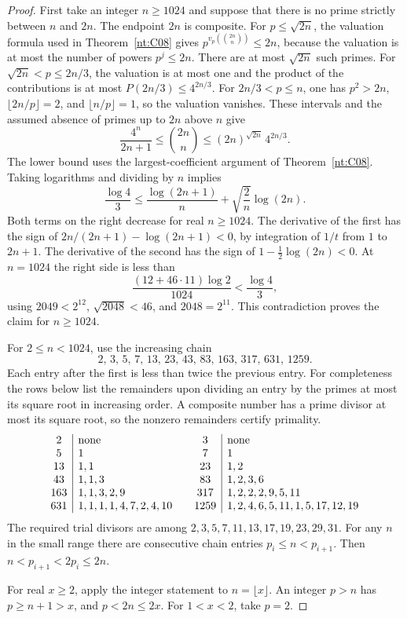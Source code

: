 \documentclass[11pt,oneside,openany]{book}
\theoremstyle{plain}
\theoremstyle{definition}
\theoremstyle{remark}
\begin{document}
\begin{proof}
First take an integer \(n\ge1024\) and suppose that there is no prime
strictly between \(n\) and \(2n\). The endpoint \(2n\) is composite.
For \(p\le\sqrt{2n}\), the valuation formula used in
Theorem~\ref{nt:C08} gives \(p^{v_p(\binom{2n}{n})}\le2n\), because the
valuation is at most the number of powers \(p^j\le2n\). There are at
most \(\sqrt{2n}\) such primes. For \(\sqrt{2n}<p\le 2n/3\), the
valuation is at most one and the product of the contributions is at
most \(P(2n/3)\le4^{2n/3}\). For \(2n/3<p\le n\), one has \(p^2>2n\),
\(\lfloor 2n/p\rfloor=2\), and \(\lfloor n/p\rfloor=1\), so the
valuation vanishes. These intervals and the assumed absence of
primes up to \(2n\) above \(n\) give
\[
 \frac{4^n}{2n+1}\le\binom{2n}{n}
       \le (2n)^{\sqrt{2n}}\,4^{2n/3}.
\]
The lower bound uses the largest-coefficient argument of
Theorem~\ref{nt:C08}. Taking logarithms and dividing by \(n\) implies
\[
 \frac{\log4}{3}\le
 \frac{\log(2n+1)}{n}+\sqrt{\frac2n}\log(2n).
\]
Both terms on the right decrease for real \(n\ge1024\). The derivative
of the first has the sign of
\(2n/(2n+1)-\log(2n+1)<0\), by integration of \(1/t\) from \(1\) to
\(2n+1\). The derivative of the second has the sign of
\(1-\tfrac12\log(2n)<0\). At \(n=1024\) the right side is less than
\[
 \frac{(12+46\cdot 11)\log2}{1024}<\frac{\log4}{3},
\]
using \(2049<2^{12}\), \(\sqrt{2048}<46\), and \(2048=2^{11}\).
This contradiction proves the claim for \(n\ge1024\).

For \(2\le n<1024\), use the increasing chain
\[
 2,\,3,\,5,\,7,\,13,\,23,\,43,\,83,\,163,\,317,\,631,\,1259 .
\]
Each entry after the first is less than twice the previous entry.
For completeness the rows below list the remainders upon dividing an
entry by the primes at most its square root in increasing order.
A composite number has a prime divisor at most its square root, so
the nonzero remainders certify primality.
\[
\begin{array}{c|l@{\qquad}c|l}
 2&\text{none}&3&\text{none}\\
 5&1&7&1\\
 13&1,1&23&1,2\\
 43&1,1,3&83&1,2,3,6\\
 163&1,1,3,2,9&317&1,2,2,2,9,5,11\\
 631&1,1,1,1,4,7,2,4,10&1259&1,2,4,6,5,11,1,5,17,12,19
\end{array}
\]
The required trial divisors are among
\(2,3,5,7,11,13,17,19,23,29,31\).
For any \(n\) in the small range there are consecutive chain entries
\(p_i\le n<p_{i+1}\). Then \(n<p_{i+1}<2p_i\le2n\).

For real \(x\ge2\), apply the integer statement to
\(n=\lfloor x\rfloor\). An integer \(p>n\) has \(p\ge n+1>x\), and
\(p<2n\le2x\). For \(1<x<2\), take \(p=2\).
\end{proof}
\end{document}
